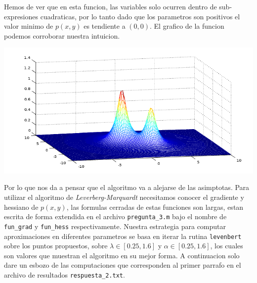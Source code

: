 \documentclass[letterpaper]{article}
\begin{document}
Hemos de ver que en esta funcion, las variables solo ocurren dentro de
sub-expresiones cuadraticas, por lo tanto dado que los parametros son
positivos el valor minimo de \(p(x,y)\) es tendiente a \((0,0)\). El
grafico de la funcion podemos corroborar nuestra intuicion.
\begin{center}
  \includegraphics[scale=0.8]{pregunta2.png}
\end{center}
Por lo que nos da a pensar que el algoritmo va a alejarse de las
asimptotas. Para utilizar el algoritmo de \emph{Leverberg-Marquardt}
necesitamos conocer el gradiente y hessiano de \(p(x,y)\), las formulas
cerradas de estas funciones son largas, estan escrita de forma extendida
en el archivo \texttt{pregunta\_3.m} bajo el nombre de \texttt{fun\_grad}
y \texttt{fun\_hess} respectivamente. Nuestra estrategia para computar
aproximaciones en diferentes parametros se basa en iterar la rutina
\texttt{levenbert} sobre los puntos propuestos, sobre \(\lambda \in
[0.25, 1.6]\) y \(\alpha \in [0.25, 1.6]\), los cuales son valores que
muestran el algoritmo en su mejor forma. A continuacion solo dare un
esbozo de las computaciones que corresponden al primer parrafo en el
archivo de resultados \texttt{respuesta\_2.txt}.
\end{document}
